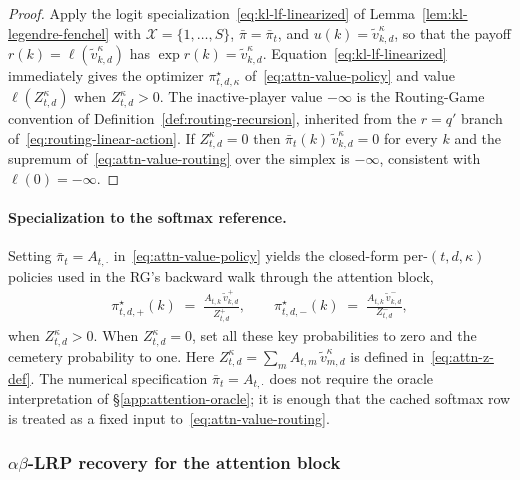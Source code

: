 \documentclass[twoside]{article}
\newcommand{\1}{\mathbf{1}}
\begin{document}
\begin{proof}
Apply the logit specialization~\eqref{eq:kl-lf-linearized} of Lemma~\ref{lem:kl-legendre-fenchel}
with $\mathcal{X} = \{1,\dots,S\}$, $\bar\pi = \bar\pi_t$, and $u(k) = \tilde{v}_{k,d}^\kappa$, so
that the payoff $r(k) = \ell(\tilde{v}_{k,d}^\kappa)$ has $\exp r(k) = \tilde{v}_{k,d}^\kappa$.
Equation~\eqref{eq:kl-lf-linearized} immediately gives the optimizer $\pi_{t,d,\kappa}^\star$
of~\eqref{eq:attn-value-policy} and value $\ell(Z_{t,d}^\kappa)$ when $Z_{t,d}^\kappa > 0$. The
inactive-player value $-\infty$ is the Routing-Game convention of
Definition~\ref{def:routing-recursion}, inherited from the $r = q'$ branch
of~\eqref{eq:routing-linear-action}. If $Z_{t,d}^\kappa = 0$ then
$\bar\pi_t(k)\,\tilde{v}_{k,d}^\kappa = 0$ for every $k$ and the supremum
of~\eqref{eq:attn-value-routing} over the simplex is $-\infty$, consistent with $\ell(0) =
    -\infty$.
\end{proof}

\paragraph{Specialization to the softmax reference.}
Setting $\bar\pi_t = A_{t,\cdot}$ in~\eqref{eq:attn-value-policy} yields the closed-form
per-$(t,d,\kappa)$ policies used in the \ac{RG}'s backward walk through the attention block,
\begin{align}\label{eq:attn-branch-policy}
    \pi_{t,d,+}^\star(k) \;=\; \frac{A_{t,k}\, \tilde{v}_{k,d}^+}{Z_{t,d}^+},
    \qquad
    \pi_{t,d,-}^\star(k) \;=\; \frac{A_{t,k}\, \tilde{v}_{k,d}^-}{Z_{t,d}^-},
\end{align}
when $Z_{t,d}^\kappa>0$. When $Z_{t,d}^\kappa=0$, set all these key probabilities to zero
and the cemetery probability to one. Here $Z_{t,d}^\kappa = \sum_m A_{t,m}\, \tilde{v}_{m,d}^\kappa$
is defined in~\eqref{eq:attn-z-def}. The
numerical specification $\bar\pi_t = A_{t,\cdot}$ does not require the oracle interpretation of
\S\ref{app:attention-oracle}; it is enough that the cached softmax row is treated as a fixed input
to~\eqref{eq:attn-value-routing}.

\subsubsection{\texorpdfstring{$\alpha\beta$-\ac{LRP}}{alpha-beta-LRP} recovery for the attention block}\label{app:attention-recovery}
\end{document}
